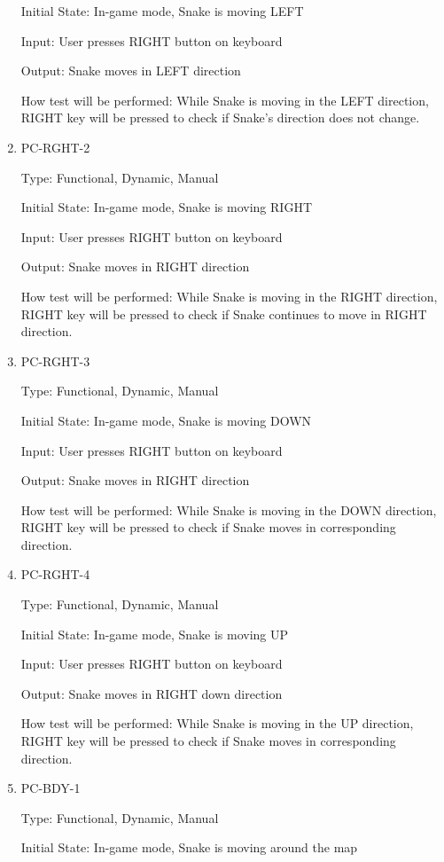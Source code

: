 \documentclass[12pt, titlepage]{article}
\begin{document}
\begin{enumerate}
Initial State: In-game mode, Snake is moving LEFT

Input: User presses RIGHT button on keyboard

Output: Snake moves in LEFT direction

How test will be performed: While Snake is moving in the LEFT direction, RIGHT key will be pressed to check if Snake's direction does not change.

\item{PC-RGHT-2}
\label{pc-rght-2}

Type: Functional, Dynamic, Manual

Initial State: In-game mode, Snake is moving RIGHT

Input: User presses RIGHT button on keyboard

Output: Snake moves in RIGHT direction

How test will be performed: While Snake is moving in the RIGHT direction, RIGHT key will be pressed to check if Snake continues to move in RIGHT direction.

\item{PC-RGHT-3}
\label{pc-rght-3}

Type: Functional, Dynamic, Manual

Initial State: In-game mode, Snake is moving DOWN

Input: User presses RIGHT button on keyboard

Output: Snake moves in RIGHT direction

How test will be performed: While Snake is moving in the DOWN direction, RIGHT key will be pressed to check if Snake moves in corresponding direction.

\item{PC-RGHT-4}
\label{pc-rght-4}

Type: Functional, Dynamic, Manual

Initial State: In-game mode, Snake is moving UP

Input: User presses RIGHT button on keyboard

Output: Snake moves in RIGHT down direction

How test will be performed: While Snake is moving in the UP direction, RIGHT key will be pressed to check if Snake moves in corresponding direction.

\item{PC-BDY-1}
\label{pc-bdy-1}

Type: Functional, Dynamic, Manual

Initial State: In-game mode, Snake is moving around the map


\end{enumerate}
\end{document}
